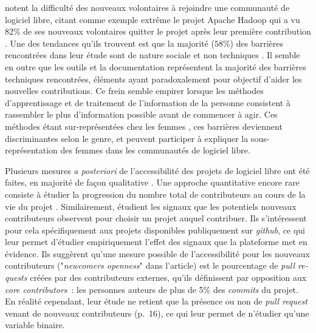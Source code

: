 \documentclass[dvipsnames,runningheads]{llncs}
\newcommand{\en}[1]{\foreignlanguage{english}{\emph{#1}}}
\begin{document}
    \textcite{barriers-2018} notent la difficulté des nouveaux volontaires à rejoindre une communauté de
    logiciel libre, citant comme exemple extrême le projet Apache Hadoop qui a vu 82\% de ses nouveaux
    volontaires quitter le projet après leur première contribution \parencite{hadoop-dropout-2013}. Une des
    tendances qu'ils trouvent est que la majorité ($58\%$) des barrières rencontrées dans leur étude sont de
    nature sociale et non techniques \parencite[p.~1008]{barriers-2018}. Il semble en outre que les outils et
    la documentation représentent la majorité des barrières techniques rencontrées, éléments ayant
    paradoxalement pour objectif d'aider les nouvelles contributions. Ce frein semble empirer lorsque les
    méthodes d'apprentissage et de traitement de l'information de la personne consistent à rassembler le plus
    d'information possible avant de commencer à agir. Ces méthodes étant sur-représentées chez les femmes
    \parencite{gender-information-processing-1995,gender-information-processing-2015}, ces barrières
    deviennent discriminantes selon le genre, et peuvent participer à expliquer la sous-représentation des
    femmes dans les communautés de logiciel libre.

    \label{sec:accessibility-measure}
    Plusieurs mesures \emph{a posteriori} de l'accessibilité des projets de logiciel libre ont été faites, en
    majorité de façon qualitative \parencites{newcomers-accessibility-2016}{newcomers-onboarding-2018}[voir
    aussi][]{newcomers-adaptation-2005}. Une approche quantitative encore rare consiste à étudier la
    progression du nombre total de contributeurs au cours de la vie du projet \cite{contributor-count-2006}.
    Similairement, \textcite{signals-2019} étudient les signaux que les potentiels nouveaux contributeurs
    observent pour choisir un projet auquel contribuer. Ils s'intéressent pour cela spécifiquement aux projets
    disponibles publiquement sur \en{github}, ce qui leur permet d'étudier empiriquement l'effet des signaux
    que la plateforme met en évidence. Ils suggèrent qu'une mesure possible de l'accessibilité pour les
    nouveaux contributeurs ("\en{newcomers openness}" dans l'article) est le pourcentage de \en{pull requests}
    créées par des contributeurs externes, qu'ils définissent par opposition aux \en{core contributors} : les
    personnes auteurs de plus de 5\% des \en{commits} du projet. En réalité cependant, leur étude ne retient
    que la présence ou non de \en{pull request} venant de nouveaux contributeurs (p.~16), ce qui leur permet
    de n'étudier qu'une variable binaire.
\end{document}
